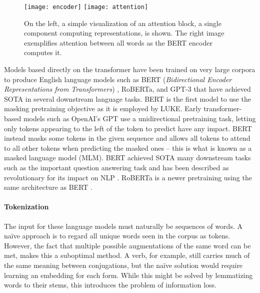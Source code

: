 \documentclass[main.tex]{subfiles}
\begin{document}
\begin{figure}[H]
    \centering
    \texttt{[image: encoder]}\hfill
    \texttt{[image: attention]}
    \caption{
        On the left, a simple visualization of an attention block, a single component computing representations, is shown.
        The right image exemplifies attention between all words as the BERT encoder computes it.\protect\footnotemark
    }
    \label{fig:transformer}
\end{figure}\noindent
{}\noindent
Models based directly on the transformer have been trained on very large corpora to produce English language models such as BERT (\emph{Bidirectional Encoder Representations from Transformers}) \cite{devlin2019bert}, RoBERTa, \cite{liu2019roberta} and GPT-3 \cite{brown2020language} that have achieved SOTA in several downstream language tasks.
BERT is the first model to use the masking pretraining objective as it is employed by LUKE.
Early transformer-based models such as OpenAI's GPT \cite{rashford2018gpt} use a unidirectional pretraining task, letting only tokens appearing to the left of the token to predict have any impact.
BERT instead masks some tokens in the given sequence and allows all tokens to attend to all other tokens when predicting the masked ones -- this is what is known as a masked language model (MLM).
BERT achieved SOTA many downstream tasks such as the important question answering task and has been described as revolutionary for its impact on NLP \cite{raj2019bert}.
RoBERTa is a newer pretraining using the same architecture as BERT \cite{liu2019roberta}.

\paragraph{Tokenization}
The input for these language models must naturally be sequences of words.
A naïve approach is to regard all unique words seen in the corpus as tokens.
However, the fact that multiple possible augmentations of the same word can be met, makes this a suboptimal method.
A verb, for example, still carries much of the same meaning between conjugations, but the naïve solution would require learning an embedding for each form.
While this might be solved by lemmatizing words to their stems, this introduces the problem of information loss.
\end{document}
